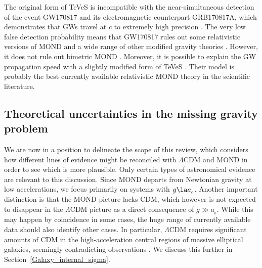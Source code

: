 \documentclass[fleqn,usenatbib,useAMS,onecolumn]{mnras} %
\begin{document}
The original form of TeVeS is incompatible with the near-simultaneous detection of the event GW170817 and its electromagnetic counterpart GRB170817A, which demonstrates that GWs travel at $c$ to extremely high precision \citep{LIGO_Virgo_2017}. The very low false detection probability means that GW170817 rules out some relativistic versions of MOND \citep{Boran_2018} and a wide range of other modified gravity theories \citep{Amendola_2018, Battye_2018, Copeland_2019}. However, it does not rule out bimetric MOND \citep{Milgrom_2009_bimetric}. Moreover, it is possible to explain the GW propagation speed with a slightly modified form of TeVeS \citep{Skordis_2019}. Their model is probably the best currently available relativistic MOND theory in the scientific literature.



\subsection{Theoretical uncertainties in the missing gravity problem}
\label{Theoretical_uncertainties}

We are now in a position to delineate the scope of this review, which considers how different lines of evidence might be reconciled with $\Lambda$CDM and MOND in order to see which is more plausible. Only certain types of astronomical evidence are relevant to this discussion. Since MOND departs from Newtonian gravity at low accelerations, we focus primarily on systems with $g \la a_{_0}$. Another important distinction is that the MOND picture lacks CDM, which however is not expected to disappear in the $\Lambda$CDM picture as a direct consequence of $g \gg a_{_0}$. While this may happen by coincidence in some cases, the huge range of currently available data should also identify other cases. In particular, $\Lambda$CDM requires significant amounts of CDM in the high-acceleration central regions of massive elliptical galaxies, seemingly contradicting observations \citep{Tian_2019}. We discuss this further in Section~\ref{Galaxy_internal_sigma}.
\end{document}
